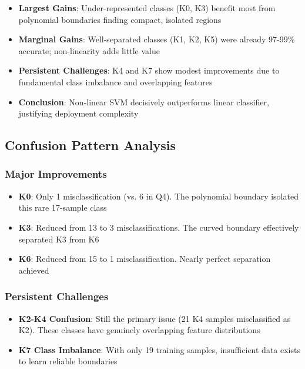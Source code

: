 \documentclass[12pt]{article}
\begin{document}
\begin{itemize}
    \item \textbf{Largest Gains}: Under-represented classes (K0, K3) benefit most from polynomial boundaries finding compact, isolated regions
    \item \textbf{Marginal Gains}: Well-separated classes (K1, K2, K5) were already 97-99\% accurate; non-linearity adds little value
    \item \textbf{Persistent Challenges}: K4 and K7 show modest improvements due to fundamental class imbalance and overlapping features
    \item \textbf{Conclusion}: Non-linear SVM decisively outperforms linear classifier, justifying deployment complexity
\end{itemize}

\subsection{Confusion Pattern Analysis}

\subsubsection{Major Improvements}

\begin{itemize}
    \item \textbf{K0}: Only 1 misclassification (vs. 6 in Q4). The polynomial boundary isolated this rare 17-sample class
    \item \textbf{K3}: Reduced from 13 to 3 misclassifications. The curved boundary effectively separated K3 from K6
    \item \textbf{K6}: Reduced from 15 to 1 misclassification. Nearly perfect separation achieved
\end{itemize}

\subsubsection{Persistent Challenges}

\begin{itemize}
    \item \textbf{K2-K4 Confusion}: Still the primary issue (21 K4 samples misclassified as K2). These classes have genuinely overlapping feature distributions
    \item \textbf{K7 Class Imbalance}: With only 19 training samples, insufficient data exists to learn reliable boundaries
\end{itemize}
\end{document}
